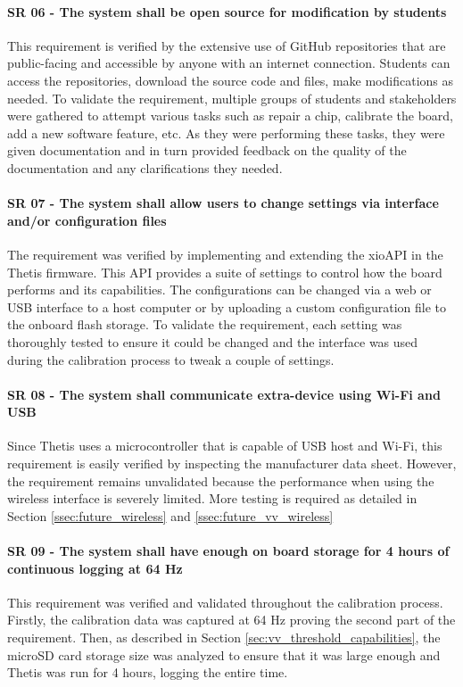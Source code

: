 \paragraph*{SR 06 - The system shall be open source for modification by students} This requirement is verified by the extensive use of GitHub repositories that are public-facing and accessible by anyone with an internet connection.
Students can access the repositories, download the source code and files, make modifications as needed.
To validate the requirement, multiple groups of students and stakeholders were gathered to attempt various tasks such as repair a chip, calibrate the board, add a new software feature, etc.
As they were performing these tasks, they were given documentation and in turn provided feedback on the quality of the documentation and any clarifications they needed.

\paragraph*{SR 07 - The system shall allow users to change settings via interface and/or configuration files} The requirement was verified by implementing and extending the xioAPI in the Thetis firmware.
This API provides a suite of settings to control how the board performs and its capabilities.
The configurations can be changed via a web or USB interface to a host computer or by uploading a custom configuration file to the onboard flash storage.
To validate the requirement, each setting was thoroughly tested to ensure it could be changed and the interface was used during the calibration process to tweak a couple of settings.

\paragraph*{SR 08 - The system shall communicate extra-device using Wi-Fi and USB} Since Thetis uses a microcontroller that is capable of USB host and Wi-Fi, this requirement is easily verified by inspecting the manufacturer data sheet.
However, the requirement remains unvalidated because the performance when using the wireless interface is severely limited.
More testing is required as detailed in Section \ref{ssec:future_wireless} and \ref{ssec:future_vv_wireless}

\paragraph*{SR 09 - The system shall have enough on board storage for 4 hours of continuous logging at 64 Hz} This requirement was verified and validated throughout the calibration process.
Firstly, the calibration data was captured at 64 Hz proving the second part of the requirement.
Then, as described in Section \ref{sec:vv_threshold_capabilities}, the microSD card storage size was analyzed to ensure that it was large enough and Thetis was run for 4 hours, logging the entire time.